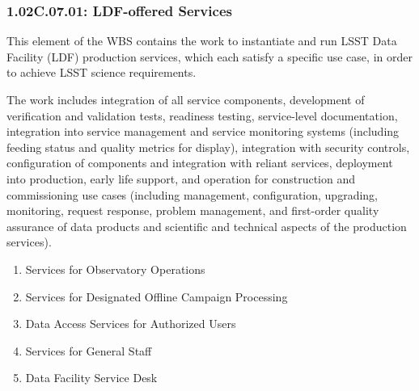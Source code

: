 \subsubsection{1.02C.07.01: LDF-offered Services}

This element of the WBS contains the work to instantiate and run LSST Data Facility (LDF) production services, which each satisfy a specific use case, in order to achieve LSST science requirements.

The work includes integration of all service components, development of verification and validation tests, readiness testing, service-level documentation, integration into service management and service monitoring systems (including feeding status and quality metrics for display), integration with security controls, configuration of components and integration with reliant services, deployment into production, early life support, and operation for construction and commissioning use cases (including management, configuration, upgrading, monitoring, request response, problem management, and first-order quality assurance of data products and scientific and technical aspects of the production services).

\begin{enumerate}

  \item{Services for Observatory Operations}
  \item{Services for Designated Offline Campaign Processing}
  \item{Data Access Services for Authorized Users}
  \item{Services for General Staff}
  \item{Data Facility Service Desk}

\end{enumerate}

